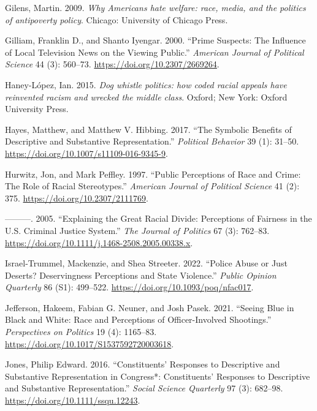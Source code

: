 \documentclass[
  12pt,
]{article}
\newlength{\cslhangindent}
\newlength{\cslentryspacingunit} %
\newenvironment{CSLReferences}[2] %
 {%
  \setlength{\parindent}{0pt}
  \ifodd #1
  \let\oldpar\par
  \def\par{\hangindent=\cslhangindent\oldpar}
  \fi
  \setlength{\parskip}{#2\cslentryspacingunit}
 }%
 {}
\begin{document}
\begin{CSLReferences}{1}{0}
\leavevmode{}%
Gilens, Martin. 2009. \emph{Why Americans hate welfare: race, media, and
the politics of antipoverty policy}. Chicago: University of Chicago
Press.

\leavevmode{}%
Gilliam, Franklin D., and Shanto Iyengar. 2000. {``Prime Suspects: The
Influence of Local Television News on the Viewing Public.''}
\emph{American Journal of Political Science} 44 (3): 560--73.
\url{https://doi.org/10.2307/2669264}.

\leavevmode{}%
Haney-López, Ian. 2015. \emph{Dog whistle politics: how coded racial
appeals have reinvented racism and wrecked the middle class}. Oxford;
New York: Oxford University Press.

\leavevmode{}%
Hayes, Matthew, and Matthew V. Hibbing. 2017. {``The Symbolic Benefits
of Descriptive and Substantive Representation.''} \emph{Political
Behavior} 39 (1): 31--50.
\url{https://doi.org/10.1007/s11109-016-9345-9}.

\leavevmode{}%
Hurwitz, Jon, and Mark Peffley. 1997. {``Public Perceptions of Race and
Crime: The Role of Racial Stereotypes.''} \emph{American Journal of
Political Science} 41 (2): 375. \url{https://doi.org/10.2307/2111769}.

\leavevmode{}%
---------. 2005. {``Explaining the Great Racial Divide: Perceptions of
Fairness in the U.S. Criminal Justice System.''} \emph{The Journal of
Politics} 67 (3): 762--83.
\url{https://doi.org/10.1111/j.1468-2508.2005.00338.x}.

\leavevmode{}%
Israel-Trummel, Mackenzie, and Shea Streeter. 2022. {``Police Abuse or
Just Deserts? Deservingness Perceptions and State Violence.''}
\emph{Public Opinion Quarterly} 86 (S1): 499--522.
\url{https://doi.org/10.1093/poq/nfac017}.

\leavevmode{}%
Jefferson, Hakeem, Fabian G. Neuner, and Josh Pasek. 2021. {``Seeing
Blue in Black and White: Race and Perceptions of Officer-Involved
Shootings.''} \emph{Perspectives on Politics} 19 (4): 1165--83.
\url{https://doi.org/10.1017/S1537592720003618}.

\leavevmode{}%
Jones, Philip Edward. 2016. {``Constituents' Responses to Descriptive
and Substantive Representation in Congress*: Constituents' Responses to
Descriptive and Substantive Representation.''} \emph{Social Science
Quarterly} 97 (3): 682--98. \url{https://doi.org/10.1111/ssqu.12243}.


\end{CSLReferences}
\end{document}
